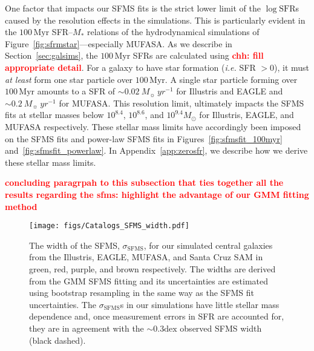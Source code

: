 \documentclass[preprint2,tighten]{aastex62}
\newcommand{\todo}[1]{{\bf \textcolor{red}{ #1}}}
\begin{document}
One factor that impacts our SFMS fits is the strict lower limit of the 
$\log\mathrm{SFR}$s caused by the resolution effects in the simulations. 
This is particularly evident in the $100\,\mathrm{Myr}$ SFR--$M_*$ 
relations of the hydrodynamical simulations of Figure~\ref{fig:sfrmstar}---especially 
MUFASA. As we describe in Section~\ref{sec:galsims}, the $100\,\mathrm{Myr}$ SFRs are 
calculated using \todo{chh: fill appropriate detail}. For a galaxy to 
have star formation (\emph{i.e.} SFR $> 0$), it must \emph{at least} 
form one star particle over $100\,\mathrm{Myr}$. A single star particle 
forming over $100\,\mathrm{Myr}$ amounts to a SFR of 
$\sim 0.02\ M_{\sun}\ yr^{-1}$ for Illustris and EAGLE and
$\sim 0.2\ M_{\sun}\ yr^{-1}$ for MUFASA. This resolution limit, ultimately 
impacts the SFMS fits at stellar masses below $10^{8.4}$, $10^{8.6}$, and 
$10^{9.4}M_\odot$ for Illustris, EAGLE, and MUFASA respectively. 
These stellar mass limits have accordingly been imposed on the SFMS fits
and power-law SFMS fits in Figures~\ref{fig:sfmsfit_100myr} 
and~\ref{fig:sfmsfit_powerlaw}. In Appendix~\ref{app:zerosfr}, we describe
how we derive these stellar mass limits. 

\todo{concluding paragrpah to this subsection that ties together all the
results regarding the sfms: 
highlight the advantage of our GMM fitting method}

\begin{figure}
\begin{center}
\texttt{[image: figs/Catalogs\_SFMS\_width.pdf]}
\caption{The width of the SFMS, $\sigma_\mathrm{SFMS}$, for our simulated 
central galaxies from the Illustris, EAGLE, MUFASA, and Santa Cruz SAM in 
green, red, purple, and brown respectively. The widths are derived from  
the GMM SFMS fitting and its uncertainties are estimated using bootstrap
resampling in the same way as the SFMS fit uncertainties. The
$\sigma_\mathrm{SFMS}$s in our simulations have little stellar mass 
dependence and, once measurement errors in SFR are accounted for, they 
are in agreement with the $\sim 0.3\mathrm{dex}$ observed SFMS width 
(black dashed).} \label{fig:sfms_width}
\end{center}
\end{figure}
\end{document}
